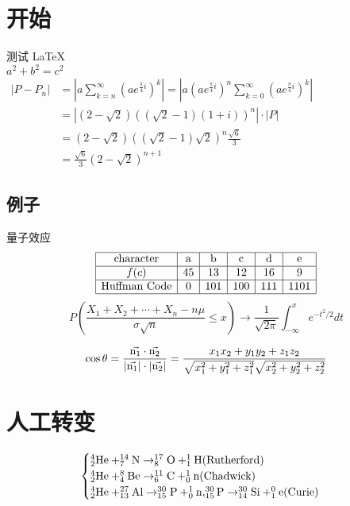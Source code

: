 \documentclass[UTF8]{article}
\begin{document}
       
 
\section{开始}   
测试       
\LaTeX \,\\ 
 $a^2+b^2=c^2$\\
 $\begin{aligned}
    \left|P-P_{n}\right|&=\left|a \sum_{k=n}^{\infty}\left(a e^{\frac{\pi}{4} i}\right)^{k}\right|=\left|a\left(a e^{\frac{\pi}{4} i}\right)^{n} \sum_{k=0}^{\infty}\left(a e^{\frac{\pi}{4} i}\right)^{k}\right|\\&=\left|(2-\sqrt{2})((\sqrt{2}-1)(1+i))^{n}\right| \cdot|P|\\&=(2-\sqrt{2})((\sqrt{2}-1) \sqrt{2})^{n} \frac{\sqrt{6}}{3}\\&=\frac{\sqrt{6}}{3}(2-\sqrt{2})^{n+1}\end{aligned}$

\subsection{例子}  

量子效应\cite{Can}
\\
$$\begin{array}{|c|c|c|c|c|c|}
    \hline
    \text{character}&\text{a}&\text{b}&\text{c}&\text{d}&\text{e}\\
    \hline
    f(c)&45&13&12&16&9\\
    \hline
    \text{Huffman Code}&0&101&100&111&1101\\
    \hline
    \end{array}$$
$$P\left(\frac{X_{1}+X_{2}+\cdots+X_{n}-n \mu}{\sigma \sqrt{n}} \leq x\right)\to \frac{1}{\sqrt{2 \pi}} \int_{-\infty}^{x} e^{-t^{2} / 2} d t$$



$$
\cos\theta=\frac{\vec{\rm{n_1}}\cdot\vec{\rm{n_2}}  }{|\vec{\rm{n_1}}|\cdot|\vec{\rm{n_2}}|}=\frac{x_{1} x_{2}+y_{1} y_{2}+z_{1} z_{2}}{\sqrt{x_{1}^{2}+y_{1}^{2}+z_{1}^{2}} \sqrt{x_{2}^{2}+y_{2}^{2}+z_{2}^{2}}}
$$
\section{人工转变}

$$
\begin{cases}\rm
    _{2}^{4}He+ _{7}^{14}N \rightarrow _{8}^{17}O + _{1}^{1}H(Rutherford)\\\rm
    _{2}^{4}He+ _{4}^{8}Be \rightarrow _{6}^{11}C + _{0}^{1}n(Chadwick)\\\rm
    _{2}^{4}He+ _{13}^{27}Al \rightarrow _{15}^{30}P + _{0}^{1}n,_{15}^{30}P \rightarrow _{14}^{30}Si + _{1}^{0}e(Curie)
    \end{cases}
$$
\end{document}
